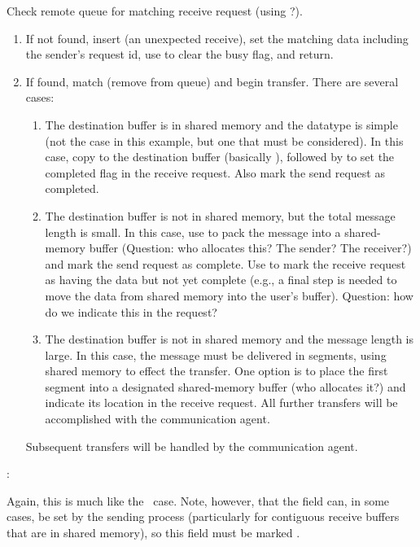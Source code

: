 \begin{mmadi}
\begin{shmem}
Check remote queue for matching receive request (using
?).  
\begin{enumerate}
\item If not found, insert (an unexpected receive), set the matching data
  including the sender's 
  request id, use  to clear the busy flag, and
  return. 
\item If found, match (remove from queue) and begin transfer.  There are
  several cases:
    \begin{enumerate}
    \item The destination buffer is in shared memory and the datatype is
      simple (not the case in this example, but one that must be considered). 
      In this case, copy to the destination buffer (basically
      ), followed by  to set
      the completed flag in the receive request.  Also mark the send request
      as completed.
    \item The destination buffer is not in shared memory, but the total
      message length is small.  In this case, use  to pack
      the message into a shared-memory buffer (Question: who allocates this?
      The sender?  The receiver?) and mark the send request as complete.
      Use  to mark the receive request as having
      the data but not yet complete (e.g., a final step is needed to move the
      data from shared memory into the user's buffer).  Question: how do we
      indicate this in the request?
    \item The destination buffer is not in shared memory and the message
      length is large.  In this case, the message must be delivered in
      segments, using shared memory to effect the transfer.  One option is to
      place the first segment into a designated shared-memory buffer (who
      allocates it?) and indicate its location in the receive request.  All
      further transfers will be accomplished with the communication agent.
    \end{enumerate}
    Subsequent transfers will be handled by the communication agent.
\end{enumerate}

:

Again, this is much like the \tcpname\ case.  Note, however, that the
 field can, in some cases, be set by the
sending process (particularly for contiguous receive buffers that are in
shared memory), so this field must be marked .


\end{shmem}
\end{mmadi}

